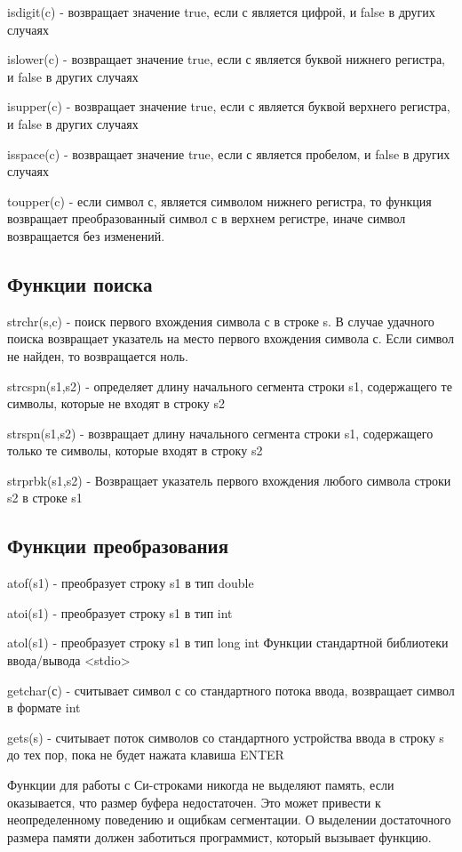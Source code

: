 \documentclass[14pt, a4paper]{extarticle}
\begin{document}
isdigit(c) - возвращает значение true, если с является цифрой, и false в других случаях

islower(c) - возвращает значение true, если с является буквой нижнего регистра, и false в других случаях

isupper(c) - возвращает значение true, если с является буквой верхнего регистра, и false в других случаях

isspace(c) - возвращает значение true, если с является пробелом, и false в других случаях

toupper(c) - если символ с, является символом нижнего регистра, то функция возвращает преобразованный символ
с в верхнем регистре, иначе символ возвращается без изменений.
\subsection*{Функции поиска}

strchr(s,c) -  поиск первого вхождения символа с в строке s. В случае удачного поиска возвращает указатель
на место первого вхождения символа с. Если символ не найден, то возвращается ноль.

strcspn(s1,s2) - определяет длину начального сегмента строки s1, содержащего те символы, которые не входят в строку s2

strspn(s1,s2) - возвращает длину начального сегмента строки s1, содержащего только те символы, которые входят в строку s2

strprbk(s1,s2) - Возвращает указатель  первого вхождения любого символа строки s2 в строке s1

\subsection*{Функции преобразования}

atof(s1) - преобразует строку s1 в тип double

atoi(s1) - преобразует строку s1 в тип int

atol(s1) - преобразует строку s1 в тип long int
Функции стандартной библиотеки ввода/вывода <stdio>

getchar(с) - считывает символ с со стандартного потока ввода, возвращает символ в формате int

gets(s) - считывает поток символов со стандартного устройства ввода в строку s до тех пор, пока не будет нажата клавиша ENTER

\vspace{1cm}

Функции для работы с Си-строками никогда не выделяют память, если оказывается, что размер буфера недостаточен. Это 
может привести к неопределенному поведению и ощибкам сегментации. О выделении
достаточного размера памяти должен заботиться программист, который вызывает функцию.
\end{document}
